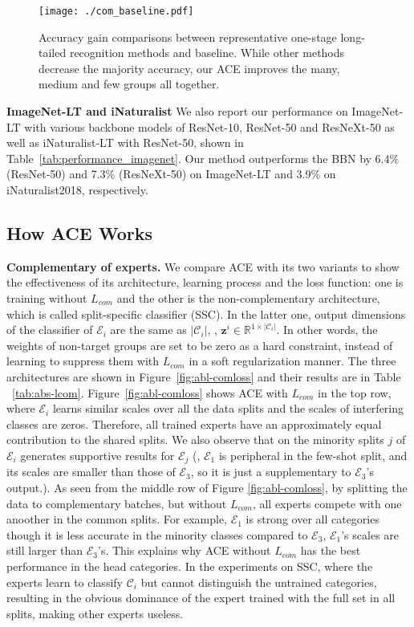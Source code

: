 \begin{figure}[h]
\begin{center}
\texttt{[image: ./com\_baseline.pdf]}
\end{center}
   \caption{Accuracy gain comparisons between representative one-stage long-tailed recognition methods and baseline. While other methods decrease the majority accuracy, our ACE improves the many, medium and few groups all together.}
\label{fig:result}
\end{figure}

\textbf{ImageNet-LT and iNaturalist} We also report our performance on ImageNet-LT with various backbone models of ResNet-10, ResNet-50 and ResNeXt-50 as well as iNaturalist-LT with ResNet-50, shown in Table~\ref{tab:performance_imagenet}. Our method outperforms the BBN by 6.4$\%$ (ResNet-50) and  7.3$\%$ (ResNeXt-50) on ImageNet-LT and 3.9$\%$ on iNaturalist2018, respectively.

\subsection{How ACE Works}
\label{abs}
\textbf{Complementary of experts.} We compare ACE with its two variants to show the effectiveness of its architecture, learning process and the loss function: one is training without $L_{com}$ and the other is the non-complementary architecture, which is called split-specific classifier (SSC). In the latter one, output dimensions of the classifier of $\mathcal{E}_i$ are the same as $|\mathcal{C}_i|$, \ie, $\textbf{z}^{i} \in \mathbb{R}^{1\times|\mathcal{C}_i|}$. In other words, the weights of non-target groups are set to be zero as a hard constraint, instead of learning to suppress them with $L_{com}$ in a soft regularization manner. The three architectures are shown in Figure~\ref{fig:abl-comloss} and their results are in Table ~\ref{tab:abs-lcom}. Figure~\ref{fig:abl-comloss} shows ACE with $L_{com}$ in the top row, where $\mathcal{E}_i$ learns similar scales over all the data splits and the scales of interfering classes are zeros. Therefore, all trained experts have an approximately equal contribution to the shared splits. We also observe that on the minority splits $j$ of $\mathcal{E}_i$  generates supportive results for $\mathcal{E}_j$ (\eg, $\mathcal{E}_1$ is peripheral in the few-shot split, and its scales are smaller than those of $\mathcal{E}_3$, so it is just a supplementary to $\mathcal{E}_3$'s output.). As seen from the middle row of Figure \ref{fig:abl-comloss}, by splitting the data to complementary batches, but without $L_{com}$, all experts  compete with one anoother in the common splits. For example, $\mathcal{E}_1$ is strong over all categories though it is less accurate in the minority classes compared to $\mathcal{E}_3$, $\mathcal{E}_1$'s scales are still larger than $\mathcal{E}_3$'s. This explains why ACE without $L_{com}$ has the best performance in the head categories. In the experiments on SSC, where the experts learn to classify $\mathcal{C}_i$ but cannot distinguish the untrained categories, resulting in the obvious dominance of the expert trained with the full set in all splits, making other experts useless. 

